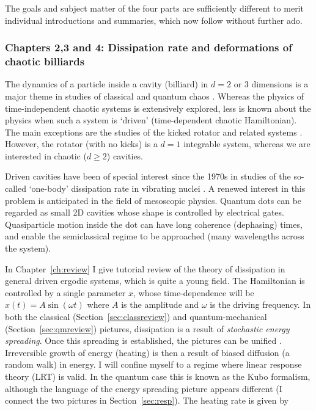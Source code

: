 The goals and subject matter of the four parts are sufficiently different
to merit individual introductions and summaries, which now follow without
further ado.



\subsubsection{Chapters 2,3 and 4: Dissipation rate and
deformations of chaotic billiards}


The dynamics of a particle inside a cavity
(billiard) in $d=2$ or 3 dimensions 
is a major theme in studies of classical and quantum chaos
\cite{ottbook,hellerleshouches,berryleshouches}.
Whereas the physics of time-independent chaotic systems 
is extensively explored, less is known 
about the physics when such a system is `driven' (time-dependent
chaotic Hamiltonian).
The main exceptions are the studies of 
the kicked rotator and related systems \cite{qkr}. 
However, the rotator (with no kicks) 
is a $d=1$ integrable system, whereas we 
are interested in chaotic ($d\ge2$) cavities.


Driven cavities have been of special interest since the 1970s in
studies of the so-called `one-body' dissipation rate in vibrating nuclei 
\cite{wall,koonincl,kooninqm,jarz92,jarz93}.
A renewed interest in this problem is anticipated
in the field of mesoscopic physics. Quantum dots \cite{been,dittrich}
can be regarded as small 2D cavities whose shape 
is controlled by electrical gates. Quasiparticle motion inside the dot
can have long coherence (dephasing) times,
and enable the semiclassical regime to be approached (many wavelengths
across the system).


In Chapter~\ref{ch:review} I give tutorial review of the
theory of dissipation in general driven
ergodic systems, which is quite a young field.
The Hamiltonian is controlled by a single parameter $x$, whose
time-dependence will be $x(t)=A\sin(\omega t)$ where $A$ is the amplitude  
and $\omega$ is the driving frequency.
In both the classical (Section~\ref{sec:classreview}) and quantum-mechanical
(Section~\ref{sec:qmreview}) pictures, dissipation is a result of
{\em stochastic energy spreading}.
Once this spreading is established, the pictures can be unified \cite{doronfrc}.
Irreversible growth of energy (heating) is then a result of biased diffusion
(a random walk) in energy.
I will confine myself to a regime where linear response theory (LRT) is valid.
In the quantum case this is known as the Kubo formalism, although the
language of the energy spreading picture appears different (I connect the
two pictures in Section~\ref{sec:resp}).
The heating rate is given by
